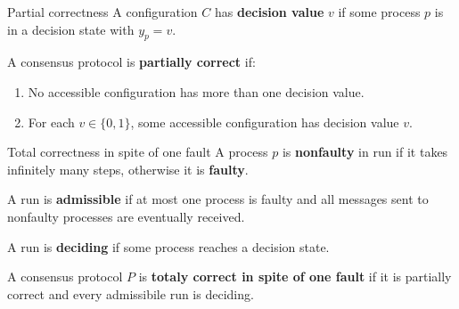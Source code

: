 \documentclass[12pt]{beamer}
\begin{document}
  \begin{frame}{Partial correctness}
    A configuration \(C\) has \textbf{decision value} \(v\) if some process
    \(p\) is in a decision state with \(y_p = v\).

    \vspace{0.25cm}

    \begin{definition}
      A consensus protocol is \textbf{partially correct} if:
      \begin{enumerate}
        \item No accessible configuration has more than one decision value.
        \item For each \(v\in \{0,1\}\), some accessible configuration has decision value \(v\).
      \end{enumerate}
    \end{definition}
  \end{frame}

  \begin{frame}{Total correctness in spite of one fault}
    A process \(p\) is \textbf{nonfaulty} in run if it takes infinitely many
    steps, otherwise it is \textbf{faulty}.

    \vspace{0.25cm}

    A run is \textbf{admissible} if at most one process is faulty and all
    messages sent to nonfaulty processes are eventually received.

    \vspace{0.25cm}

    A run is \textbf{deciding} if some process reaches a decision state.

    \vspace{0.25cm}

    \begin{definition}
      A consensus protocol \(P\) is \textbf{totaly correct in spite of one
      fault} if it is partially correct and every admissibile run is deciding.
    \end{definition}
  \end{frame}
\end{document}
